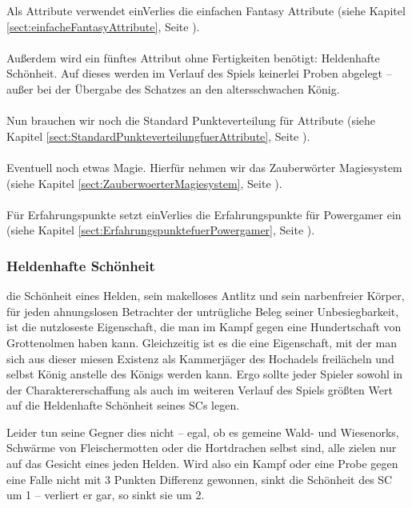 Als Attribute verwendet einVerlies die einfachen Fantasy Attribute (siehe Kapitel \ref {sect:einfacheFantasyAttribute}, Seite \pageref {sect:einfacheFantasyAttribute}).
\\
\\
Außerdem wird ein fünftes Attribut ohne Fertigkeiten benötigt: Heldenhafte Schönheit. Auf dieses werden im Verlauf des Spiels keinerlei Proben abgelegt -- außer bei der Übergabe des Schatzes an den altersschwachen König.
\\
\\
Nun brauchen wir noch die Standard Punkteverteilung für Attribute (siehe Kapitel \ref {sect:StandardPunkteverteilungfuerAttribute}, Seite \pageref {sect:StandardPunkteverteilungfuerAttribute}).
\\
\\
Eventuell noch etwas Magie. Hierfür nehmen wir das Zauberwörter Magiesystem (siehe Kapitel \ref {sect:ZauberwoerterMagiesystem}, Seite \pageref {sect:ZauberwoerterMagiesystem}).
\\
\\
Für Erfahrungspunkte setzt einVerlies die Erfahrungspunkte für Powergamer ein (siehe Kapitel \ref {sect:ErfahrungspunktefuerPowergamer}, Seite \pageref {sect:ErfahrungspunktefuerPowergamer}).

 
\subsubsection{Heldenhafte Schönheit}

die Schönheit eines Helden, sein makelloses Antlitz und sein narbenfreier Körper, für jeden ahnungslosen Betrachter der untrügliche Beleg seiner Unbesiegbarkeit, ist die nutzloseste Eigenschaft, die man im Kampf gegen eine Hundertschaft von Grottenolmen haben kann. Gleichzeitig ist es die eine Eigenschaft, mit der man sich aus dieser miesen Existenz als Kammerjäger des Hochadels freilächeln und selbst König anstelle des Königs werden kann. Ergo sollte jeder Spieler sowohl in der Charaktererschaffung als auch im weiteren Verlauf des Spiels größten Wert auf die Heldenhafte Schönheit seines SCs legen.

Leider tun seine Gegner dies nicht -- egal, ob es gemeine Wald- und Wiesenorks, Schwärme von Fleischermotten oder die Hortdrachen selbst sind, alle zielen nur auf das Gesicht eines jeden Helden. Wird also ein Kampf oder eine Probe gegen eine Falle nicht mit 3 Punkten Differenz gewonnen, sinkt die Schönheit des SC um 1 -- verliert er gar, so sinkt sie um 2.


